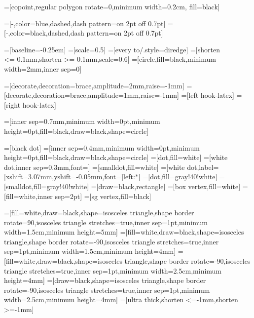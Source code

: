 =[copoint,regular polygon rotate=0,minimum width=0.2cm, fill=black]

=[-,color=blue,dashed,dash pattern=on 2pt off 0.7pt]
=[-,color=black,dashed,dash pattern=on 2pt off 0.7pt]


=[baseline=-0.25em]
=[scale=0.5]
=[every to/.style={diredge}]
=[shorten <=-0.1mm,shorten >=-0.1mm,scale=0.6]
=[circle,fill=black,minimum width=2mm,inner sep=0]

\newcommand{\phantombox}[1]{\tikz[baseline=(current bounding box).east]{\path [use as bounding box] (0,0) rectangle #1;}}
=[decorate,decoration={brace,amplitude=2mm,raise=-1mm}]
=[decorate,decoration={brace,amplitude=1mm,raise=-1mm}]
=[left hook-latex]
=[right hook-latex]

\newcommand{\measurement}{\tikz[scale=0.6]{ \draw [use as bounding box,draw=none] (0,-0.1) rectangle (1,0.7); \draw [fill=white] (1,0) arc (0:180:5mm); \draw (0,0) -- (1,0) (0.5,0) -- +(60:7mm);}}


=[inner sep=0.7mm,minimum width=0pt,minimum height=0pt,fill=black,draw=black,shape=circle]

=[black dot]
=[inner sep=0.4mm,minimum width=0pt,minimum height=0pt,fill=black,draw=black,shape=circle]%
=[dot,fill=white]
=[white dot,inner sep=0.3mm,font=\footnotesize]
=[smalldot,fill=white]%
=[white dot,label={[xshift=3.07mm,yshift=-0.05mm,font=\footnotesize]left:$*$}]
=[dot,fill=gray!40!white]
=[smalldot,fill=gray!40!white]%
=[draw=black,rectangle]
=[box vertex,fill=white]%
=[fill=white,inner sep=2pt]
=[sg vertex,fill=black]

=[fill=white,draw=black,shape=isosceles triangle,shape border rotate=90,isosceles triangle stretches=true,inner sep=1pt,minimum width=1.5cm,minimum height=5mm]
=[fill=white,draw=black,shape=isosceles triangle,shape border rotate=-90,isosceles triangle stretches=true,inner sep=1pt,minimum width=1.5cm,minimum height=4mm]
=[fill=white,draw=black,shape=isosceles triangle,shape border rotate=-90,isosceles triangle stretches=true,inner sep=1pt,minimum width=2.5cm,minimum height=4mm]
=[draw=black,shape=isosceles triangle,shape border rotate=-90,isosceles triangle stretches=true,inner sep=1pt,minimum width=2.5cm,minimum height=4mm]
=[ultra thick,shorten <=-1mm,shorten >=-1mm]

